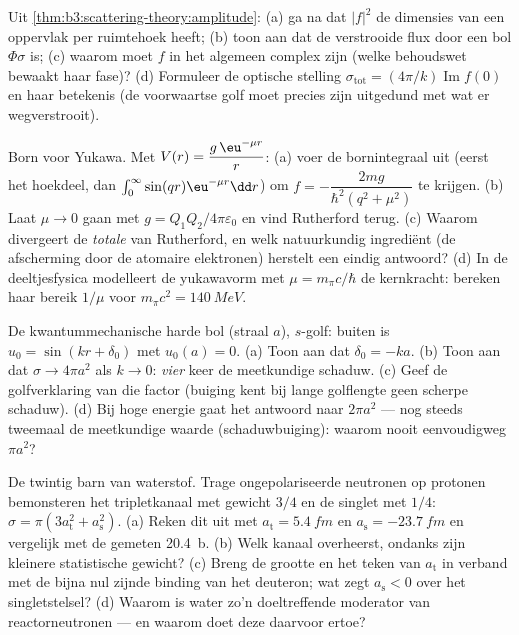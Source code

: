 \begin{exercise}[$\star$]\label{exo:b3:scattering-theory:4}
Uit \cref{thm:b3:scattering-theory:amplitude}: (a) ga na dat $|f|^2$ de
dimensies van een oppervlak per ruimtehoek heeft; (b) toon aan dat de
verstrooide flux door een bol $\Phi\sigma$ is; (c) waarom moet $f$ in het
algemeen complex zijn (welke behoudswet bewaakt haar fase)? (d) Formuleer
de optische stelling $\sigma_{\text{tot}} =
(4\pi/k)\operatorname{Im}f(0)$
en haar betekenis (de voorwaartse golf moet precies zijn uitgedund met wat
er wegverstrooit).
\end{exercise}

\begin{exercise}[$\star\star$]\label{exo:b3:scattering-theory:5}
Born voor Yukawa. Met $V(r) = \dfrac{g\,\eu^{-\mu r}}{r}$: (a) voer de
bornintegraal uit (eerst het hoekdeel, dan $\int_0^
\infty\sin(qr)\eu^{-\mu r}\dd r$) om $f = -\dfrac{2mg}
{\hbar^2(q^2 + \mu^2)}$ te krijgen. (b) Laat
$\mu \to 0$ gaan met $g =
Q_1Q_2/4\pi\varepsilon_0$ en vind Rutherford
terug. (c) Waarom divergeert de \emph{totale}  van
Rutherford, en welk natuurkundig ingrediënt (de afscherming door de
atomaire elektronen) herstelt een eindig antwoord? (d) In de
deeltjesfysica modelleert de yukawavorm met $\mu =
m_\pi c/\hbar$ de
kernkracht: bereken haar bereik $1/\mu$ voor $m_\pi c^2 = \qty{140}{MeV}$.
\end{exercise}

\begin{exercise}[$\star\star$]\label{exo:b3:scattering-theory:6}
De kwantummechanische harde bol (straal $a$), $s$-golf: buiten is $u_0 =
\sin(kr + \delta_0)$ met $u_0(a) = 0$. (a) Toon aan dat $\delta_0 = -ka$.
(b) Toon aan dat $\sigma \to 4\pi a^2$ als $k \to 0$: \emph{vier} keer de
meetkundige schaduw. (c) Geef de golfverklaring van die factor (buiging
kent bij lange golflengte geen scherpe schaduw). (d) Bij hoge energie gaat
het antwoord naar $2\pi a^2$ --- nog steeds tweemaal de meetkundige
waarde (schaduwbuiging): waarom nooit eenvoudigweg $\pi a^2$?
\end{exercise}

\begin{exercise}[$\star\star$]\label{exo:b3:scattering-theory:7}
De twintig barn van waterstof. Trage ongepolariseerde neutronen op
protonen bemonsteren het tripletkanaal met gewicht $3/4$ en de singlet met
$1/4$: $\sigma = \pi(3a_{\text{t}}^2 +
a_{\text{s}}^2)$. (a) Reken dit uit
met $a_{\text{t}} = \qty{5.4}{fm}$ en $a_{\text{s}} = \qty{-23.7}{fm}$ en
vergelijk met de gemeten \qty{20.4}{b}. (b) Welk kanaal overheerst,
ondanks zijn kleinere statistische gewicht? (c) Breng de grootte en het
teken van $a_{\text{t}}$ in verband met de bijna nul zijnde binding van
het deuteron; wat zegt $a_{\text{s}} < 0$ over het singletstelsel? (d)
Waarom is water zo'n doeltreffende moderator van reactorneutronen --- en
waarom doet deze  daarvoor ertoe?
\end{exercise}


